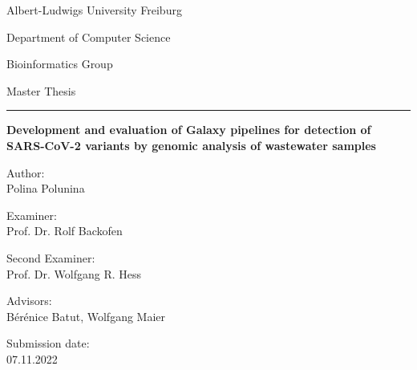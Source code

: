 %
\begin{titlepage}
 \centering
 Albert-Ludwigs University Freiburg
 
 Department of Computer Science
 
 Bioinformatics Group
 \vspace{4cm}
 
  Master Thesis
 \vspace{3mm} 
  
 \huge \hrule \vspace{5mm}
 \textbf{Development and evaluation of Galaxy pipelines for detection of SARS-CoV-2 variants by genomic analysis of wastewater samples}
 
 \hrulefill
 
 \vfill
 \raggedright
 \normalsize
  Author:\\
  Polina Polunina 
  
  Examiner:\\
  Prof. Dr. Rolf Backofen
  
  Second Examiner:\\
  Prof. Dr. Wolfgang R. Hess
  
  Advisors:\\
  Bérénice Batut, Wolfgang Maier
  
  Submission date:\\
  07.11.2022

\end{titlepage}
